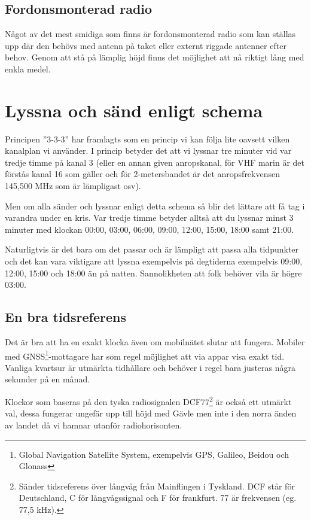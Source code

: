 \subsection{Fordonsmonterad radio}

Något av det mest smidiga som finns är fordonsmonterad radio som kan ställas
upp där den behövs med antenn på taket eller externt riggade antenner efter
behov. Genom att stå på lämplig höjd finns det möjlighet att nå riktigt lång
med enkla medel.

\section{Lyssna och sänd enligt schema}


Principen ''3-3-3'' har framlagts som en princip vi kan följa lite oavsett vilken
kanalplan vi använder. I princip betyder det att vi lyssnar tre minuter vid
var tredje timme på kanal 3 (eller en annan given anropskanal, för VHF marin
är det förstås kanal 16 som gäller och för 2-metersbandet är det
anropsfrekvensen 145,500 MHz som är lämpligast osv).

Men om alla sänder och lyssnar enligt detta schema så blir det lättare att få
tag i varandra under en kris. Var tredje timme betyder alltså att du lyssnar
minst 3 minuter med klockan 00:00, 03:00, 06:00, 09:00, 12:00, 15:00, 18:00
samt 21:00.

Naturligtvis är det bara om det passar och är lämpligt att passa alla
tidpunkter och det kan vara viktigare att lyssna exempelvis på degtiderna
exempelvis 09:00, 12:00, 15:00 och 18:00 än på natten. Sannolikheten att folk
behöver vila är högre 03:00.

\subsection{En bra tidsreferens}

Det är bra att ha en exakt klocka även om mobilnätet slutar att fungera.
Mobiler med GNSS\footnote{Global Navigation Satellite System, exempelvis GPS,
Galileo, Beidou och Glonass}-mottagare har som regel möjlighet att via appar
visa exakt tid. Vanliga kvartsur är utmärkta tidhållare och behöver i regel
bara justeras några sekunder på en månad.

Klockor som baseras på den tyska radiosignalen DCF77\footnote{Sänder
tidsreferens över långvåg från Mainflingen i Tyskland. DCF står för
Deutschland, C för långvågssignal och F för frankfurt. 77 är frekvensen (eg.
77,5 kHz).} är också ett utmärkt val, dessa fungerar ungefär upp till höjd med
Gävle men inte i den norra änden av landet då vi hamnar utanför
radiohorisonten.

